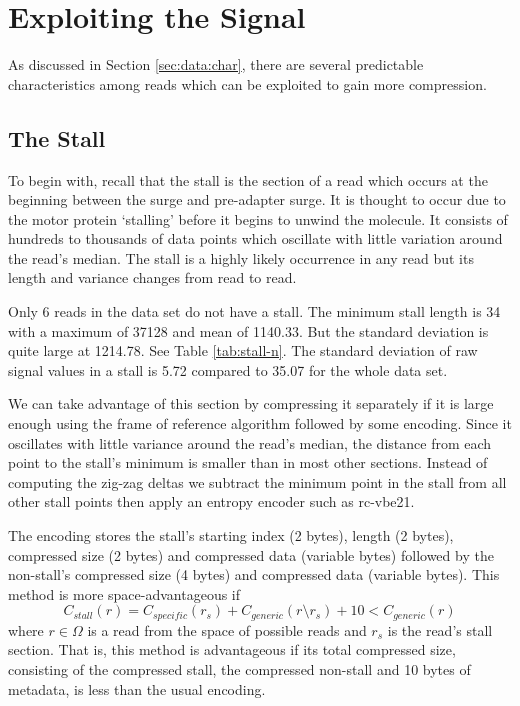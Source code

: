\section{Exploiting the Signal}

As discussed in Section
\ref{sec:data:char},
there are several predictable characteristics among reads which can be exploited
to gain more compression.

\subsection{The Stall}

To begin with, recall that the stall is the section of a read which occurs at
the beginning between the surge and pre-adapter surge. It is thought to occur
due to the motor protein `stalling' before it begins to unwind the molecule.
It consists of hundreds to thousands of data points which oscillate with little
variation around the read's median. The stall is a highly likely occurrence in
any read but its length and variance changes from read to read.

Only 6 reads in the data set do not have a stall. The minimum stall length is 34
with a maximum of \num{37128} and mean of 1140.33. But the standard deviation is
quite large at 1214.78. See Table \ref{tab:stall-n}. The standard deviation of
raw signal values in a stall is 5.72 compared to 35.07 for the whole data set.



We can take advantage of this section by compressing it separately if it is
large enough using the frame of reference algorithm followed by some encoding.
Since it oscillates with little variance around the read's median, the distance
from each point to the stall's minimum is smaller than in most other sections.
Instead of computing the zig-zag deltas we subtract the minimum point in the
stall from all other stall points then apply an entropy encoder such as
rc-vbe21.

The encoding stores the stall's starting index (2 bytes), length (2 bytes),
compressed size (2 bytes) and compressed data (variable bytes) followed by the
non-stall's compressed size (4 bytes) and compressed data (variable bytes). This
method is more space-advantageous if
\[ C_{stall}(r) = C_{specific}(r_s) + C_{generic}(r\setminus r_s) + 10 < C_{generic}(r) \]
where $r\in\Omega$ is a read from the space of possible reads and $r_s$ is the
read's stall section. That is, this method is advantageous if its total
compressed size, consisting of the compressed stall, the compressed non-stall
and 10 bytes of metadata, is less than the usual encoding.

